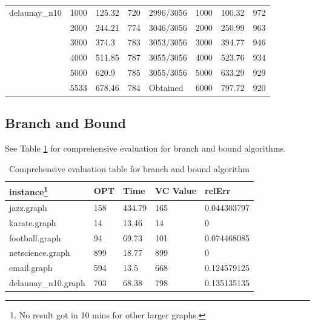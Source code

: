 \begin{table}[htb]
\begin{minipage}{\columnwidth}
\begin{center}
\begin{tabular}{@{}llllllll@{}}
delaunay\_n10 & 1000      & 125.32 & 720 & 2996/3056                                          & 1000        & 100.32   & 972  \\
              & 2000      & 244.21 & 774 & 3046/3056                                          & 2000        & 250.99   & 963  \\
              & 3000      & 374.3  & 783 & 3053/3056                                          & 3000        & 394.77   & 946  \\
              & 4000      & 511.85 & 787 & 3055/3056                                          & 4000        & 523.76   & 934  \\
              & 5000      & 620.9  & 785 & 3055/3056                                          & 5000        & 633.29   & 929  \\
              & 5533      & 678.46 & 784 & Obtained                                           & 6000        & 797.72   & 920  \\ \bottomrule
\end{tabular}
\end{center}
\end{minipage}
\end{table}

\subsection{Branch and Bound}
See Table \ref{tab3} for comprehensive evaluation for branch and bound algorithms.
\begin{table}[htb]
\caption{Comprehensive evaluation table for branch and bound algorithm}
\label{tab3}
\begin{minipage}{\columnwidth}
\begin{center}
\begin{tabular}{@{}lllll@{}}
\toprule
instance\footnote{No result got in 10 mins for other larger graphs.} & OPT & Time   & VC Value & relErr      \\ \midrule
jazz.graph          & 158 & 434.79 & 165      & 0.044303797 \\
karate.graph        & 14  & 13.46  & 14       & 0           \\
football.graph      & 94  & 69.73  & 101      & 0.074468085 \\
netscience.graph    & 899 & 18.77  & 899      & 0           \\
email.graph         & 594 & 13.5   & 668      & 0.124579125 \\
delaunay\_n10.graph & 703 & 68.38  & 798      & 0.135135135 \\ \bottomrule
\end{tabular}
\end{center}
\end{minipage}
\end{table}

